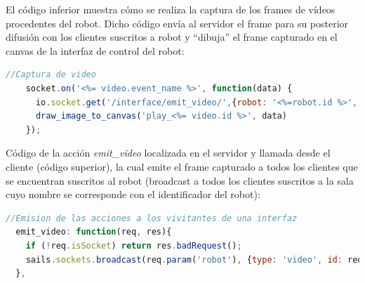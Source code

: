  
El código inferior muestra cómo se realiza la captura de los frames de vídeos procedentes del robot. Dicho código envía al servidor el frame para su posterior difusión con los clientes suscritos
a robot y ``dibuja'' el frame capturado en el canvas de la interfaz de control del robot:\\
 
 
\begin{lstlisting}[language=JavaScript] 
    //Captura de video
    socket.on('<%= video.event_name %>', function(data) {
      io.socket.get('/interface/emit_video/',{robot: '<%=robot.id %>', id: '<%= video.id %>', msg: data });
      draw_image_to_canvas('play_<%= video.id %>', data)
    });
\end{lstlisting}


Código de la acción \emph{emit\_video} localizada en el servidor y llamada desde el cliente (código superior), la cual emite el frame capturado a todos los clientes que se encuentran suscritos al robot 
(broadcast a todos los clientes suscritos a la sala cuyo nombre se corresponde con el identificador del robot):\\

\begin{lstlisting}[language=JavaScript] 
  //Emision de las acciones a los vivitantes de una interfaz
  emit_video: function(req, res){
    if (!req.isSocket) return res.badRequest();
    sails.sockets.broadcast(req.param('robot'), {type: 'video', id: req.param('id'), msg: req.param('msg')});
  },
\end{lstlisting}



